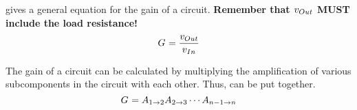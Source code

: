 gives a general equation for the gain of a circuit.
\textbf{Remember that $\ACVoltage{\Out}$ MUST include the load resistance!}
\begin{equation}\label{eq:Gain}
  \Gain{} = \frac{\ACVoltage{\Out}}{\ACVoltage{\In}}
\end{equation}

The gain of a circuit can be calculated by multiplying the amplification of various subcomponents in the circuit with each other.
Thus,  can be put together.
\begin{equation}\label{eq:Gain-Broken}
  G_{} = A_{1 \to 2} A_{2 \to 3} \cdots A_{n-1 \to n}
\end{equation}

